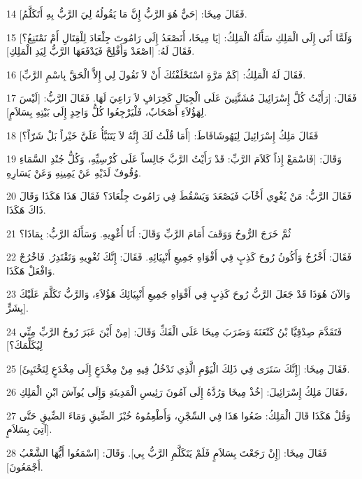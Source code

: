 \par 14 فَقَالَ مِيخَا: [حَيٌّ هُوَ الرَّبُّ إِنَّ مَا يَقُولُهُ لِيَ الرَّبُّ بِهِ أَتَكَلَّمُ].
\par 15 وَلَمَّا أَتَى إِلَى الْمَلِكِ سَأَلَهُ الْمَلِكُ: [يَا مِيخَا، أَنَصْعَدُ إِلَى رَامُوتَ جِلْعَادَ لِلْقِتَالِ أَمْ نَمْتَنِعُ؟] فَقَالَ لَهُ: [اصْعَدْ وَأَفْلِحْ فَيَدْفَعَهَا الرَّبُّ لِيَدِ الْمَلِكِ].
\par 16 فَقَالَ لَهُ الْمَلِكُ: [كَمْ مَرَّةٍ اسْتَحْلَفْتُكَ أَنْ لاَ تَقُولَ لِي إِلاَّ الْحَقَّ بِاسْمِ الرَّبِّ].
\par 17 فَقَالَ: [رَأَيْتُ كُلَّ إِسْرَائِيلَ مُشَتَّتِينَ عَلَى الْجِبَالِ كَخِرَافٍ لاَ رَاعِيَ لَهَا. فَقَالَ الرَّبُّ: [لَيْسَ لِهَؤُلاَءِ أَصْحَابٌ، فَلْيَرْجِعُوا كُلُّ وَاحِدٍ إِلَى بَيْتِهِ بِسَلاَمٍ].
\par 18 فَقَالَ مَلِكُ إِسْرَائِيلَ لِيَهُوشَافَاطَ: [أَمَا قُلْتُ لَكَ إِنَّهُ لاَ يَتَنَبَّأُ عَلَيَّ خَيْراً بَلْ شَرّاً؟]
\par 19 وَقَالَ: [فَاسْمَعْ إِذاً كَلاَمَ الرَّبِّ: قَدْ رَأَيْتُ الرَّبَّ جَالِساً عَلَى كُرْسِيِّهِ، وَكُلُّ جُنْدِ السَّمَاءِ وُقُوفٌ لَدَيْهِ عَنْ يَمِينِهِ وَعَنْ يَسَارِهِ.
\par 20 فَقَالَ الرَّبُّ: مَنْ يُغْوِي أَخْآبَ فَيَصْعَدَ وَيَسْقُطَ فِي رَامُوتَ جِلْعَادَ؟ فَقَالَ هَذَا هَكَذَا وَقَالَ ذَاكَ هَكَذَا.
\par 21 ثُمَّ خَرَجَ الرُّوحُ وَوَقَفَ أَمَامَ الرَّبِّ وَقَالَ: أَنَا أُغْوِيهِ. وَسَأَلَهُ الرَّبُّ: بِمَاذَا؟
\par 22 فَقَالَ: أَخْرُجُ وَأَكُونُ رُوحَ كَذِبٍ فِي أَفْوَاهِ جَمِيعِ أَنْبِيَائِهِ. فَقَالَ: إِنَّكَ تُغْوِيهِ وَتَقْتَدِرُ. فَاخْرُجْ وَافْعَلْ هَكَذَا.
\par 23 وَالآنَ هُوَذَا قَدْ جَعَلَ الرَّبُّ رُوحَ كَذِبٍ فِي أَفْوَاهِ جَمِيعِ أَنْبِيَائِكَ هَؤُلاَءِ، وَالرَّبُّ تَكَلَّمَ عَلَيْكَ بِشَرٍّ].
\par 24 فَتَقَدَّمَ صِدْقِيَّا بْنُ كَنْعَنَةَ وَضَرَبَ مِيخَا عَلَى الْفَكِّ وَقَالَ: [مِنْ أَيْنَ عَبَرَ رُوحُ الرَّبِّ مِنِّي لِيُكَلِّمَكَ؟]
\par 25 فَقَالَ مِيخَا: [إِنَّكَ سَتَرَى فِي ذَلِكَ الْيَوْمِ الَّذِي تَدْخُلُ فِيهِ مِنْ مِخْدَعٍ إِلَى مِخْدَعٍ لِتَخْتَبِئَ].
\par 26 فَقَالَ مَلِكُ إِسْرَائِيلَ: [خُذْ مِيخَا وَرُدَّهُ إِلَى آمُونَ رَئِيسِ الْمَدِينَةِ وَإِلَى يُوآشَ ابْنِ الْمَلِكِ،
\par 27 وَقُلْ هَكَذَا قَالَ الْمَلِكُ: ضَعُوا هَذَا فِي السِّجْنِ، وَأَطْعِمُوهُ خُبْزَ الضِّيقِ وَمَاءَ الضِّيقِ حَتَّى آتِيَ بِسَلاَمٍ].
\par 28 فَقَالَ مِيخَا: [إِنْ رَجَعْتَ بِسَلاَمٍ فَلَمْ يَتَكَلَّمِ الرَّبُّ بِي]. وَقَالَ: [اسْمَعُوا أَيُّهَا الشَّعْبُ أَجْمَعُونَ].
